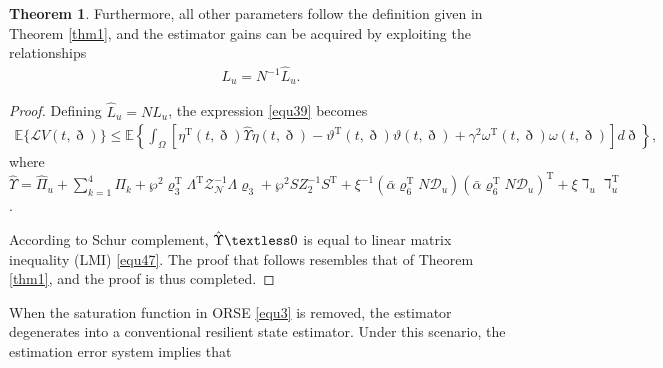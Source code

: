 \documentclass[preprint,review,fleqn,sort&compress,3p]{elsarticle}
\theoremstyle{definition}%
\newtheorem{thm}{Theorem}[section]
\begin{document}
\begin{thm}
	Furthermore, all other parameters follow the definition given in Theorem \ref{thm1}, and the estimator gains can be acquired by exploiting the relationships
	\begin{align}
		L_u=N^{-1}\hat{L}_u.
	\end{align}
	\begin{proof}
		Defining $\hat{L}_u=NL_u$, the expression \eqref{equ39} becomes
		\begin{align}
			\mathbb{E}\{ \mathcal{L} V(t, \eth) \} \leq \mathbb{E} \left\{ \int_{\Omega} \left[ \eta^\text{T}(t, \eth) \hat{\Upsilon} \eta(t,\eth) - \vartheta^\text{T}(t, \eth) \vartheta(t, \eth) + \gamma^2 \omega^\text{T}(t, \eth) \omega(t, \eth) \right] d\eth \right\},
		\end{align}
		where $\hat{\Upsilon}=\hat{\Pi}_u+\sum_{k=1}^4 \Pi_k+\wp^2\varrho^\text{T}_3 \Lambda^\text{T}\mathcal{Z}^{-1}_\mathcal{N}\Lambda\varrho_3+\wp^2 S Z^{-1}_2 S^\text{T}+ \xi^{-1} \left( \bar{\alpha}\varrho_6^\text{T} N \mathcal{D}_u \right) \left( \bar{\alpha}\varrho_6^\text{T} N \mathcal{D}_u \right)^\text{T} + \xi \daleth_u \daleth_u^\text{T}$.
		
		According to Schur complement, $\hat{\Upsilon} \textless 0$  is equal to linear matrix inequality (LMI) \eqref{equ47}. The proof that follows resembles that of Theorem \ref{thm1}, and the proof is thus completed.
	\end{proof}
\end{thm}

When the saturation function in ORSE \eqref{equ3} is removed, the estimator degenerates into a conventional resilient state estimator. Under this scenario, the estimation error system implies that
\end{document}
